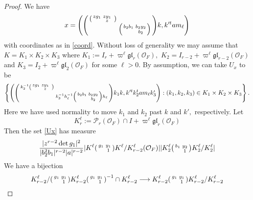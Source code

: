 \documentclass[12pt]{amsart}
\theoremstyle{remark}
\numberwithin{equation}{section}
\newcommand{\lto}{\longrightarrow}
\newcommand{\OO}{\mathcal{O}}
\theoremstyle{definition}
\newenvironment{psmatrix}
  {\left(\begin{smallmatrix}}
  {\end{smallmatrix}\right)}
\numberwithin{equation}{subsection}
\begin{document}
{\begin{proof}
We have 
$$
x=\left(\begin{psmatrix}\begin{psmatrix}zg_1 & zy_1&\\ & z \end{psmatrix}& \\ & \begin{psmatrix} b_2b_1 & b_2y_2\\ & b_2\end{psmatrix} \end{psmatrix}k,k'^tam_\ell \right)
$$
with coordinates as in \eqref{coord}.  Without loss of generality we may assume that $K=K_1 \times K_2 \times K_3$ where $K_1:=I_r+\varpi^\ell\mathfrak{gl}_r(\OO_F),$ $K_2=I_{r-2}+\varpi^\ell \mathfrak{gl}_{r-2}(\OO_F)$ and $K_3=I_2 +\varpi^\ell \mathfrak{gl}_2(\OO_F)$ for some $\ell>0.$ 
By assumption, we can take $U_x$ to be
\begin{align} \label{Ux}
\left\{\left(\begin{psmatrix}k_2^{-1}\begin{psmatrix}zg_1 & zy_1&\\ & z \end{psmatrix}& \\ & k_3^{-1}h_\ell^{-1}\begin{psmatrix} b_2b_1 & b_2y_2\\ & b_2\end{psmatrix}h_\ell \end{psmatrix}k_1k,k'^tk_2^tam_\ell k_3^{\iota} \right):(k_1,k_2,k_3) \in K_1 \times K_2 \times K_3\right\}.
\end{align}
Here we have used normality to move $k_1$ and $k_2$ past $k$ and $k',$ respectively.  Let
$$
K^\ell_r:=\mathcal{P}_r(\OO_F) \cap I+\varpi^\ell\mathfrak{gl}_r(\OO_F)
$$
Then the set \eqref{Ux} has measure
\begin{align} \label{meas}
  \frac{|z^{r-2}\det g_1|^2}{|b_2^2b_1|^{r-2}|a|^{r-2}} |K^\ell\begin{psmatrix} g_1 & y_1 \\ & 1 \end{psmatrix}K^\ell/K^\ell_{r-2}(\OO_F)||K_{2}^\ell\begin{psmatrix} b_1 & y_2 \\ & 1 \end{psmatrix}K_{2}^\ell /K_2^\ell|
\end{align}
We have a bijection
\begin{align} \label{quots} \begin{split}
K_{r-2}^\ell/\begin{psmatrix} g_1 & y_1 \\ & 1 \end{psmatrix}K_{r-2}^\ell\begin{psmatrix} g_1 & y_1 \\ & 1 \end{psmatrix}^{-1} \cap K_{r-2}^{\ell} &\lto K_{r-2}^\ell\begin{psmatrix} g_1 & y_1 \\ & 1 \end{psmatrix}K_{r-2}^\ell/K_{r-2}^\ell \\

\end{split}
\end{align}
\end{proof}}
\end{document}
